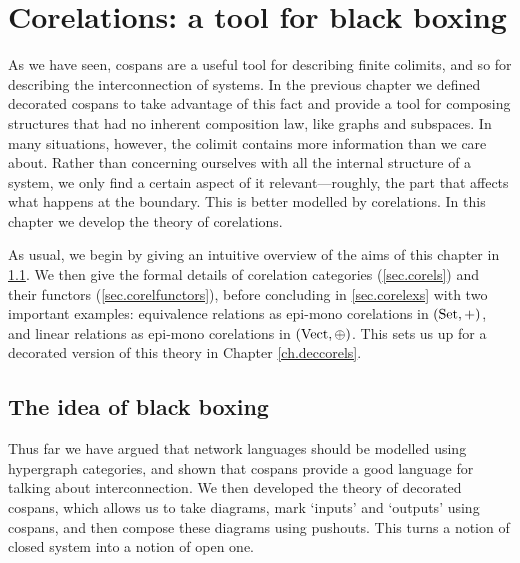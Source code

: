 \chapter{Corelations: a tool for black boxing} \label{ch.corelations}

As we have seen, cospans are a useful tool for describing finite colimits, and
so for describing the interconnection of systems. In the previous chapter
we defined decorated cospans to take advantage of this fact and provide
a tool for composing structures that had no inherent composition law, like
graphs and subspaces. In many situations, however, the colimit contains more
information than we care about.  Rather than concerning ourselves with all the
internal structure of a system, we only find a certain aspect of it
relevant---roughly, the part that affects what happens at the boundary. This is
better modelled by corelations. In this chapter we develop the theory of
corelations.

As usual, we begin by giving an intuitive overview of the aims of this chapter
in \textsection\ref{sec.blackboxing}. We then give the formal details of
corelation categories (\textsection\ref{sec.corels}) and their functors
(\textsection\ref{sec.corelfunctors}), before concluding in
\textsection\ref{sec.corelexs} with two important
examples: equivalence relations as epi-mono corelations in $(\mathrm{Set},+)$, and
linear relations as epi-mono corelations in $(\mathrm{Vect},\oplus)$. This sets us up
for a decorated version of this theory in Chapter \ref{ch.deccorels}.

\section{The idea of black boxing} \label{sec.blackboxing}

Thus far we have argued that network languages should be modelled using
hypergraph categories, and shown that cospans provide a good language for
talking about interconnection. We then developed the theory of decorated
cospans, which allows us to take diagrams, mark `inputs' and `outputs' using
cospans, and then compose these diagrams using pushouts. This turns a notion of
closed system into a notion of open one.

